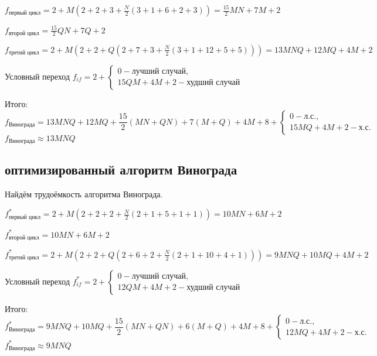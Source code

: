             $ f_\text{первый цикл} = 2 + M(2 + 2 + 3 + \frac{N}{2}(3 + 1 + 6 + 2 + 3)) = \frac{15}{2}MN + 7M + 2$
            
            $ f_\text{второй цикл} = \frac{15}{2}QN + 7Q + 2$

            $ f_\text{третий цикл} = 2 + M(2 + 2 + Q(2 + 7 + 3 + \frac{N}{2}(3 + 1 + 12 + 5 + 5))) = 13MNQ + 12MQ + 4M + 2$

            Условный переход $f_{if} = 2 + \left\{
                \begin{matrix}
                0 - \text{лучший случай},\\
                15QM + 4M + 2 - \text{худший случай} 
                \end{matrix}\right.$

            Итого:
            \begin{equation}
                f_\text{Винограда} = 13MNQ + 12MQ + \frac{15}{2}(MN + QN) + 7(M + Q) + 4M + 8 + 
                    \left\{ \begin{matrix}
                    0 - \text{л.с.},\\
                    15MQ + 4M + 2 - \text{х.с.} 
                    \end{matrix}\right.
            \end{equation}
            $ f_\text{Винограда} \approx 13MNQ $
        \subsection{оптимизированный алгоритм Винограда}

            Найдём трудоёмкость алгоритма Винограда.
                
            $ f_\text{первый цикл}^* = 2 + M(2 + 2 + 2 + \frac{N}{2}(2 + 1 + 5 + 1 + 1)) = 10MN + 6M + 2$
            
            $ f_\text{второй цикл}^* = 10MN + 6M + 2$

            $ f_\text{третий цикл}^* = 2 + M(2 + 2 + Q(2 + 6 + 2 + \frac{N}{2}(2 + 1 + 10 + 4 + 1))) = 9MNQ + 10MQ + 4M + 2$

            Условный переход $f_{if}^* = 2 + \left\{
                \begin{matrix}
                0 - \text{лучший случай},\\
                12QM + 4M + 2 - \text{худший случай} 
                \end{matrix}\right.$

            Итого:
            \begin{equation}
                f_\text{Винограда}^* = 9MNQ + 10MQ + \frac{15}{2}(MN + QN) + 6(M + Q) + 4M + 8 + 
                    \left\{ \begin{matrix}
                    0 - \text{л.с.},\\
                    12MQ + 4M + 2 - \text{х.с.} 
                    \end{matrix}\right.
            \end{equation}
            $ f_\text{Винограда}^* \approx 9MNQ $

